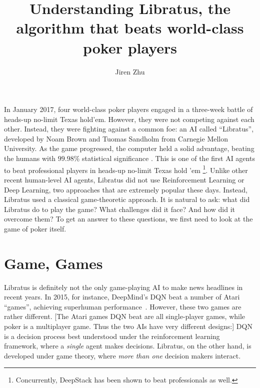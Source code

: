 \documentclass[10pt,a4paper]{article}
\author{Jiren Zhu}
\title{Understanding Libratus, the algorithm that beats world-class poker players}
\begin{document}
\maketitle

In January 2017, four world-class poker players engaged in a three-week battle of heads-up no-limit Texas hold'em. However, they were not competing against each other. Instead, they were fighting against a common foe: an AI called ``Libratus'', developed by Noam Brown and Tuomas Sandholm from Carnegie Mellon University. As the game progressed, the computer held a solid advantage, beating the humans with $99.98\%$ statistical significance \cite{brown2017superhuman}.  This is one of the first AI agents to beat professional players in heads-up no-limit Texas hold 'em \footnote{Concurrently, DeepStack \cite{moravvcik2017deepstack} has been shown to beat professionals as well.}. Unlike other recent human-level AI agents, Libratus did not use Reinforcement Learning or Deep Learning, two approaches that are extremely popular these days. Instead, Libratus used a classical game-theoretic approach. It is natural to ask: what did Libratus do to play the game? What challenges did it face? And how did it overcome them? To get an answer to these questions, we first need to look at the game of poker itself. 

\section{Game, Games}
Libratus is definitely not the only game-playing AI to make news headlines in recent years. In 2015, for instance, DeepMind's DQN beat a number of Atari ``games'', achieving superhuman performance~\cite{mnih2015human}. However, these two games are rather different. [The Atari games DQN beat are all single-player games, while poker is a multiplayer game. Thus the two AIs have very different designs:] DQN is a decision process best understood under the reinforcement learning framework, where a \textit{single} agent makes decisions. Libratus, on the other hand, is developed under game theory, where \textit{more than one} decision makers interact. 
\end{document}
